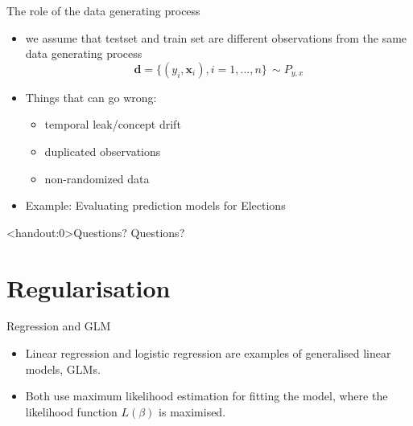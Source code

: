 \documentclass[10pt,handout]{beamer}
\begin{document}







\begin{frame}{The role of the data generating process}

\begin{itemize}
\item we assume that testset and train set are different observations from the same data generating process
\[
\mathbf{d} = \{(y_i, \mathbf{x}_i), i = 1, ..., n\} \,\sim P_{y,x}
\]
\item Things that can go wrong:
\begin{itemize}
\item temporal leak/concept drift
\item duplicated observations
\item non-randomized data
\end{itemize}
\pause
\item Example: Evaluating prediction models for Elections
\end{itemize}


\end{frame}

\begin{frame}<handout:0>{Questions?}
Questions?
\end{frame}


\section{Regularisation}
\frame{\sectionpage}

\begin{frame}{Regression and GLM}
\begin{itemize}
\item Linear regression and logistic regression are examples of {\color{uured}generalised linear models}, GLMs.\\[3mm]\pause
\item Both use maximum likelihood estimation for fitting the model, where the likelihood function $L(\beta)$ is maximised.
\end{itemize}
\end{frame}
\end{document}
